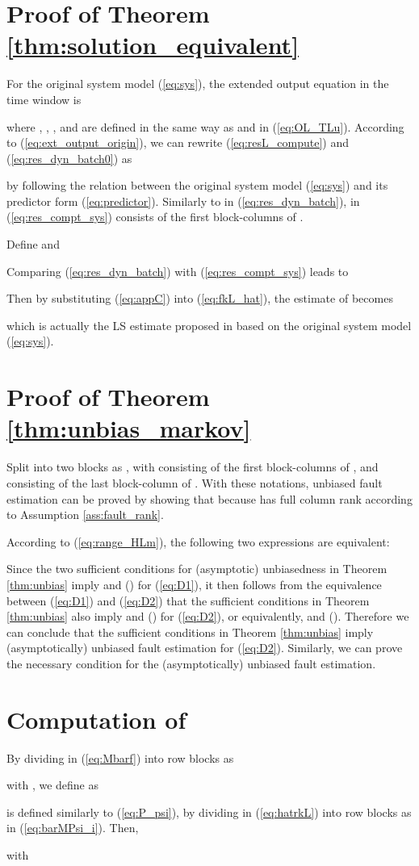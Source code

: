 \documentclass[twocolumn]{autart}
\begin{document}
\section{Proof of Theorem \ref{thm:solution_equivalent}}\label{app:equivalence}
For the original system model (\ref{eq:sys}), the extended output equation in the time window  is

where , , , and  are defined
in the same way as  and  in (\ref{eq:OL_TLu}).
According to (\ref{eq:ext_output_origin}), we can rewrite (\ref{eq:resL_compute}) and (\ref{eq:res_dyn_batch0}) as

by following the relation between the original system model (\ref{eq:sys}) and its predictor form (\ref{eq:predictor}).
Similarly to  in (\ref{eq:res_dyn_batch}),  in (\ref{eq:res_compt_sys}) consists of the first  block-columns of .


Define  and

Comparing (\ref{eq:res_dyn_batch}) with (\ref{eq:res_compt_sys}) leads to

Then by substituting (\ref{eq:appC}) into (\ref{eq:fkL_hat}), the estimate of  becomes

which is actually the LS estimate proposed in \cite{Wan2014} based on the original system model (\ref{eq:sys}).




\section{Proof of Theorem \ref{thm:unbias_markov}}\label{app:unbias_markov}

Split  into two blocks as
,
with  consisting of the first  block-columns of
, and  consisting of the last block-column of
. With these notations, unbiased fault estimation can be proved by showing that 
 because  has full column rank according to Assumption 
\ref{ass:fault_rank}.

According to (\ref{eq:range_HLm}), the following two expressions are equivalent:


\vspace{-0.5cm}

Since the two sufficient conditions for (asymptotic) unbiasedness in Theorem \ref{thm:unbias} imply  and  () for (\ref{eq:D1}), it then follows from the equivalence between (\ref{eq:D1}) and (\ref{eq:D2}) that 
the sufficient conditions in Theorem \ref{thm:unbias} also imply  and  () for (\ref{eq:D2}), or equivalently,  and  (). Therefore we can conclude that the sufficient conditions in Theorem \ref{thm:unbias} imply  (asymptotically) unbiased fault estimation for (\ref{eq:D2}). Similarly, we can prove the necessary condition for the (asymptotically) unbiased fault estimation. 


\section{{Computation of } } \label{app:computations}

By dividing  in (\ref{eq:Mbarf}) into  row blocks as

with , we define  as

 is defined similarly to (\ref{eq:P_psi}), by dividing  in (\ref{eq:hatrkL}) into  row blocks as in (\ref{eq:barMPsi_i}). Then,

with
\end{document}
